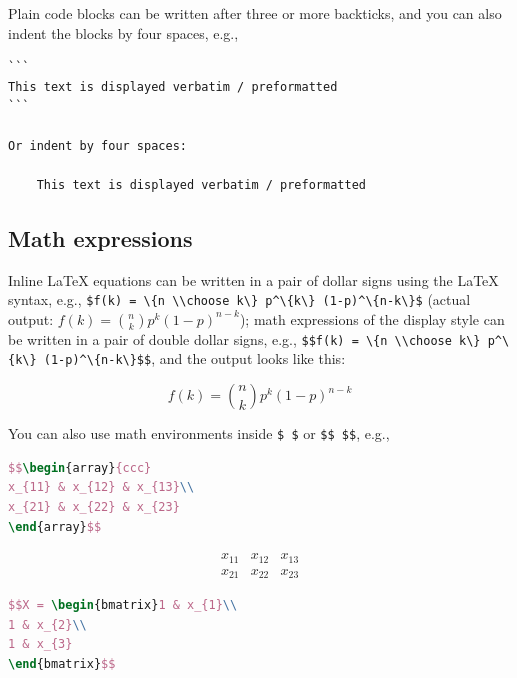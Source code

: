 \documentclass[doctor,openright,twoside]{sjtuthesis}
\newcommand{\passthrough}[1]{#1}
\theoremstyle{plain}
\theoremstyle{definition}
\theoremstyle{remark}
\theoremstyle{ocrenumbox}
\theoremstyle{plain}
\begin{document}
Plain code blocks can be written after three or more backticks, and you can also indent the blocks by four spaces, e.g.,

\begin{lstlisting}
```
This text is displayed verbatim / preformatted
```

Or indent by four spaces:

    This text is displayed verbatim / preformatted
\end{lstlisting}

\hypertarget{math-expressions}{%
\subsection{Math expressions}\label{math-expressions}}

Inline LaTeX equations can be written in a pair of dollar signs using the LaTeX syntax, e.g., \passthrough{\lstinline!$f(k) = \{n \\choose k\} p^\{k\} (1-p)^\{n-k\}$!} (actual output: \(f(k)={n \choose k}p^{k}(1-p)^{n-k}\)); math expressions of the display style can be written in a pair of double dollar signs, e.g., \passthrough{\lstinline!$$f(k) = \{n \\choose k\} p^\{k\} (1-p)^\{n-k\}$$!}, and the output looks like this:

\[f\left(k\right)=\binom{n}{k}p^k\left(1-p\right)^{n-k}\]

You can also use math environments inside \passthrough{\lstinline!$ $!} or \passthrough{\lstinline!$$ $$!}, e.g.,

\begin{lstlisting}[language=TeX]
$$\begin{array}{ccc}
x_{11} & x_{12} & x_{13}\\
x_{21} & x_{22} & x_{23}
\end{array}$$
\end{lstlisting}

\[\begin{array}{ccc}
x_{11} & x_{12} & x_{13}\\
x_{21} & x_{22} & x_{23}
\end{array}\]

\begin{lstlisting}[language=TeX]
$$X = \begin{bmatrix}1 & x_{1}\\
1 & x_{2}\\
1 & x_{3}
\end{bmatrix}$$
\end{lstlisting}
\end{document}
